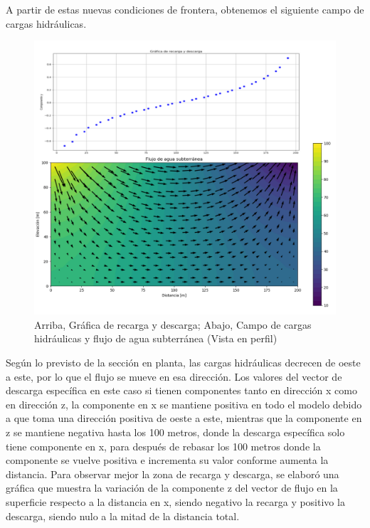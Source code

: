 A partir de estas nuevas condiciones de frontera, obtenemos el siguiente campo de cargas hidráulicas.

 \begin{figure}[H]
\centering
\includegraphics[scale=0.55]{Figure_28c.png}
\caption{Arriba, Gráfica de recarga y descarga; Abajo, Campo de cargas hidráulicas y flujo de agua subterránea (Vista en perfil)}
\label{Figura3:4}
\end{figure}

Según lo previsto de la sección en planta, las cargas hidráulicas decrecen de oeste a este, por lo que el flujo se mueve en esa dirección. Los valores del vector de descarga específica en este caso si tienen componentes tanto en dirección x como en dirección z, la componente en x se mantiene positiva en todo el modelo debido a que toma una dirección positiva de oeste a este, mientras que la componente en z se mantiene negativa hasta los 100 metros, donde la descarga específica solo tiene componente en x, para después de rebasar los 100 metros donde la componente se vuelve positiva e incrementa su valor conforme aumenta la distancia. Para observar mejor la zona de recarga y descarga, se elaboró una gráfica que muestra la variación de la componente z del vector de flujo en la superficie respecto a la distancia en x, siendo negativo la recarga y positivo la descarga, siendo nulo a la mitad de la distancia total.
\\

